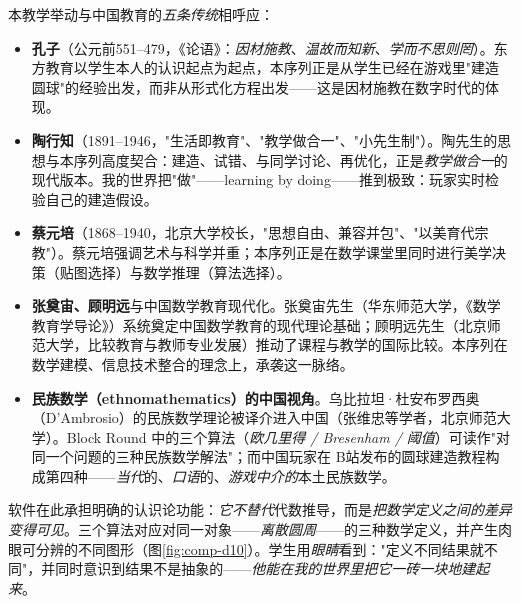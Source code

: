 \documentclass[12pt,a4paper]{scrartcl}
\newcommand{\acc}[1]{\textcolor{accent}{\textbf{#1}}}
\begin{document}
本教学举动与中国教育的\emph{五条传统}相呼应：

\begin{itemize}[leftmargin=1.3em,itemsep=0.2em,topsep=0.3em]
  \item \acc{孔子}（公元前551--479，《论语》：\emph{因材施教}、\emph{温故而知新}、\emph{学而不思则罔}）。东方教育以学生本人的认识起点为起点，本序列正是从学生已经在游戏里"建造圆球"的经验出发，而非从形式化方程出发——这是因材施教在数字时代的体现。

  \item \acc{陶行知}（1891--1946，"生活即教育"、"教学做合一"、"小先生制"）。陶先生的思想与本序列高度契合：建造、试错、与同学讨论、再优化，正是\emph{教学做合一}的现代版本。我的世界把"做"——learning by doing——推到极致：玩家实时检验自己的建造假设。

  \item \acc{蔡元培}（1868--1940，北京大学校长，"思想自由、兼容并包"、"以美育代宗教"）。蔡元培强调艺术与科学并重；本序列正是在数学课堂里同时进行美学决策（贴图选择）与数学推理（算法选择）。

  \item \acc{张奠宙、顾明远}与中国数学教育现代化。张奠宙先生（华东师范大学，《数学教育学导论》）系统奠定中国数学教育的现代理论基础；顾明远先生（北京师范大学，比较教育与教师专业发展）推动了课程与教学的国际比较。本序列在数学建模、信息技术整合的理念上，承袭这一脉络。

  \item \acc{民族数学（ethnomathematics）的中国视角}。乌比拉坦·杜安布罗西奥（D'Ambrosio）的民族数学理论被译介进入中国（张维忠等学者，北京师范大学）。Block Round 中的三个算法（\emph{欧几里得 / Bresenham / 阈值}）可读作"对同一个问题的三种民族数学解法"；而中国玩家在 B站发布的圆球建造教程构成第四种——\emph{当代}的、\emph{口语}的、\emph{游戏中介的}本土民族数学。
\end{itemize}

软件在此承担明确的认识论功能：\emph{它不替代}代数推导，而是\emph{把数学定义之间的差异变得可见}。三个算法对应对同一对象——\emph{离散圆周}——的三种数学定义，并产生肉眼可分辨的不同图形（图\ref{fig:comp-d10}）。学生用\emph{眼睛}看到："定义不同结果就不同"，并同时意识到结果不是抽象的——\emph{他能在我的世界里把它一砖一块地建起来}。
\end{document}
